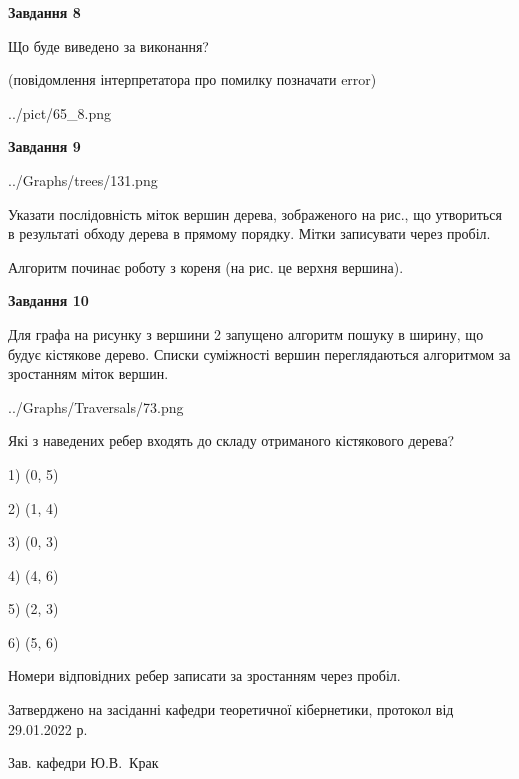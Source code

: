 \documentclass[12pt, ukrainian]{article}
\begin{document}
{\begin {large}
{\begin {center}\textbf{Завдання 8}\end {center}}\par
Що буде виведено за виконання?\par
 (повідомлення інтерпретатора про помилку позначати error)\par
\begin{center}
	{../pict/65_8.png}
\end{center}
\newpage

{\begin {center}\textbf{Завдання 9}\end {center}}\par

\begin{center}
	{../Graphs/trees/131.png}
\end{center}
Указати послідовність міток вершин дерева, зображеного на рис., що утвориться в результаті обходу дерева в прямому порядку. Мітки записувати через пробіл.\par Алгоритм починає роботу з кореня (на рис. це верхня вершина).\par
\newpage

{\begin {center}\textbf{Завдання 10}\end {center}}\par
Для графа на рисунку з вершини 2 запущено алгоритм пошуку в ширину, що будує кістякове дерево. Списки суміжності вершин переглядаються алгоритмом за зростанням міток вершин.\par
\begin{center}
	{../Graphs/Traversals/73.png}
\end{center}
\par Які з наведених ребер входять до складу отриманого кістякового дерева?\par
1) (0, 5)\par
2) (1, 4)\par
3) (0, 3)\par
4) (4, 6)\par
5) (2, 3)\par
6) (5, 6)\par
{\vskip 15pt} Номери відповідних ребер записати за зростанням через пробіл.\par
\newpage


\end {large}
}
{\smallskip \begin {small} Затверджено на засіданні кафедри теоретичної кібернетики, протокол  від   29.01.2022 р.\par\smallskip\smallskip
{\parbox {6.5 cm}{Зав. кафедри \dotfill Ю.В.~Крак}} \end{small}}
\end{document}
